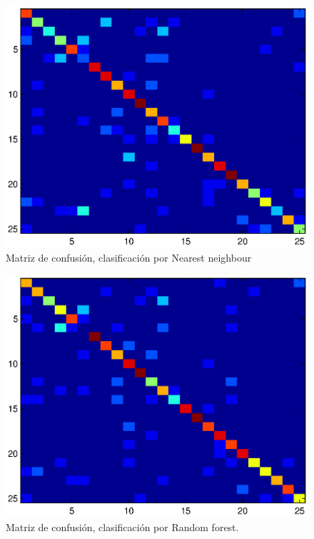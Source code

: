\documentclass[10pt,twocolumn,letterpaper]{article}
\begin{document}
\begin{figure}[t]
\begin{center}
   \includegraphics[width=1\linewidth]{con_chi.eps}
\end{center}
   \caption{Matriz de confusión, clasificación por Nearest neighbour}
\label{fig:seg}
\end{figure}


\begin{figure}[t]
\begin{center}
   \includegraphics[width=1\linewidth]{con_arb.eps}
\end{center}
   \caption{Matriz de confusión, clasificación por Random forest.}
\label{fig:seg}
\end{figure}
\end{document}
